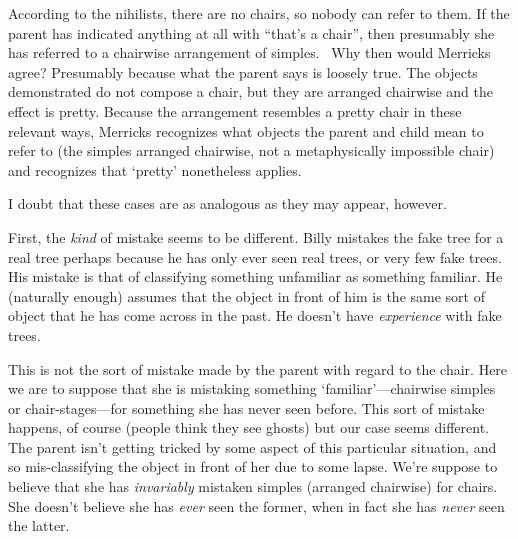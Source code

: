 \documentclass[11pt]{standalone} \newif\ifstandlone \standalonetrue
\begin{document}
\begin{spacing}{1.25}




According to the nihilists, there are no chairs, so nobody can refer
to them.  If the parent has indicated anything at all with ``that's a
chair'', then presumably she has referred to a chairwise arrangement
of simples.
%
%
\ Why then would Merricks agree?  Presumably because what the parent
says is loosely true.  The objects demonstrated do not compose a
chair, but they are arranged chairwise and the effect is pretty.
Because the arrangement resembles a pretty chair in these relevant
ways, Merricks recognizes what objects the parent and child mean to
refer to (the simples arranged chairwise, not a metaphysically
impossible chair) and recognizes that `pretty' nonetheless applies.

I doubt that these cases are as analogous as they may appear, however.

First, the {\em kind} of mistake seems to be different.  Billy
mistakes the fake tree for a real tree perhaps because he has only
ever seen real trees, or very few fake trees.  His mistake is that of
classifying something unfamiliar as something familiar.  He (naturally
enough) assumes that the object in front of him is the same sort of
object that he has come across in the past.  He doesn't have {\em
  experience} with fake trees.

This is not the sort of mistake made by the parent with regard to the
chair.  Here we are to suppose that she is mistaking something
`familiar'---chairwise simples or chair-stages---for something she has
never seen before.  This sort of mistake happens, of course (people
think they see ghosts) but our case seems different.  The parent isn't
getting tricked by some aspect of this particular situation, and so
mis-classifying the object in front of her due to some lapse.  We're
suppose to believe that she has {\em invariably} mistaken simples
(arranged chairwise) for chairs.  She doesn't believe she has {\em
  ever} seen the former, when in fact she has {\em never} seen the
latter.


\end{spacing}
\end{document}
